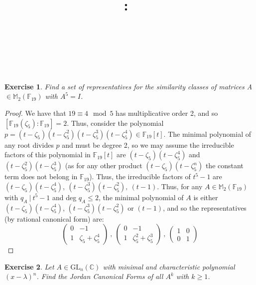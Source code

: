 \documentclass{article}
\title{
    \vspace{2in}
    \textmd{\textbf{\hmwkClass:\ \hmwkTitle}}\\
    \vspace{0.1in}
    \textmd{\hmwkDueDate} \\
    \vspace{0.2in}\large{\textit{\hmwkClassInstructor\  }}
    \vspace{2in}
}
\author{\hmwkAuthorName}
\date{}
\newcommand{\bb}[1]{\mathbb{#1}}
\newtheorem{exercise}{Exercise}
\begin{document}
\maketitle 
\newpage 
\begin{exercise}
  Find a set of representatives for the similarity classes of matrices A $\in \bb{M}_{2}(\bb{F}_{19})$ with $A^{5}=I$.
\end{exercise}
\begin{proof}
  We have that $19 \equiv 4 \mod 5$ has multiplicative order 2, and so $[\bb{F}_{19}(\zeta_{5}):\bb{F}_{19}] = 2$. Thus, consider the polynomial $p = (t - \zeta_{5})(t - \zeta_{5}^{2})(t - \zeta_{5}^{3})(t-\zeta_{5}^{4}) \in \bb{F}_{19}[t]$. The minimal polynomial of any root divides $p$ and must be degree 2, so we may assume the irreducible factors of this polynomial in $\bb{F}_{19}[t]$ are $(t - \zeta_{5})(t - \zeta_{5}^{4})$ and $(t - \zeta_{5}^{2})(t - \zeta_{5}^{3})$ (as for any other product $(t - \zeta_{5})(t - \zeta_{5}^{n})$ the constant term does not belong in $\mathbb{F}_{19}$). Thus, the irreducible factors of $t^{5}-1$ are $(t - \zeta_{5})(t - \zeta_{5}^{4}), \ (t - \zeta_{5}^{3})(t - \zeta_{5}^{2}), \ (t-1)$. Thus, for any $A \in \bb{M}_{2}(\bb{F}_{19})$ with $q_{A} \ | \ t^{5} - 1$ and deg $q_{A} \leq 2$, the minimal polynomial of $A$ is either $(t - \zeta_{5})(t - \zeta_{5}^{4})$, $(t - \zeta_{5}^{3})(t - \zeta_{5}^{2})$ or $(t-1)$, and so the representatives (by rational canonical form) are:
  \[
    \begin{pmatrix}
      0 & -1 \\
      1 & \zeta_{5} + \zeta_{5}^{4} \end{pmatrix}  \ , \
    \begin{pmatrix}
      0 & -1 \\
      1 & \zeta_{5}^{2} + \zeta_{5}^{3} \end{pmatrix} \ , \
    \begin{pmatrix}
      1 & 0 \\
      0 & 1 \end{pmatrix}
  \]
  
\end{proof}

\begin{exercise}
  Let $A \in \text{GL}_{n}(\bb{C})$ with minimal and characteristic polynomial $(x - \lambda)^{n}$. Find the Jordan Canonical Forms of all $A^{k}$ with $k \geq 1$.
\end{exercise}
\end{document}
